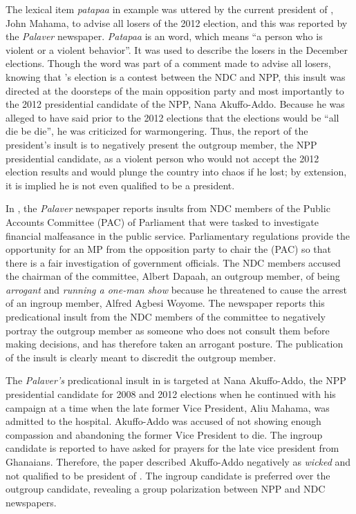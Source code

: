 \documentclass[output=paper,modfonts]{langscibook}
\begin{document}
The lexical item \textit{patapaa} in example  was uttered by the current president of , John Mahama, to advise all losers of the 2012 election, and this was reported by the \textit{ Palaver} newspaper. \textit{Patapaa} is an  word, which means “a person who is violent or a violent behavior”. It was used to describe the losers in the December elections. Though the word was part of a comment made to advise all losers, knowing that ’s election is a contest between the NDC and NPP, this insult was directed at the doorsteps of the main opposition party and most importantly to the 2012 presidential candidate of the NPP, Nana Akuffo-Addo. Because he was alleged to have said prior to the 2012 elections that the elections would be “all die be die”, he was criticized for warmongering. Thus, the report of the president’s insult is to negatively present the outgroup member, the NPP presidential candidate, as a violent person who would not accept the 2012 election results and would plunge the country into chaos if he lost; by extension, it is implied he is not even qualified to be a president.

In , the \textit{ Palaver} newspaper reports insults from NDC members of the Public Accounts Committee (PAC) of Parliament that were tasked to investigate financial malfeasance in the public service. Parliamentary regulations provide the opportunity for an MP from the opposition party to chair the (PAC) so that there is a fair investigation of government officials. The NDC members accused the chairman of the committee, Albert  Dapaah, an outgroup member, of being \textit{arrogant} and \textit{running a one-man show} because he threatened to cause the arrest of an ingroup member, Alfred Agbesi Woyome. The newspaper reports this predicational insult from the NDC members of the committee to negatively portray the outgroup member as someone who does not consult them before making decisions, and has therefore taken an arrogant posture. The publication of the insult is clearly meant to discredit the outgroup member.

The \textit{ Palaver’s} predicational insult in  is targeted at Nana Akuffo-Addo, the NPP presidential candidate for 2008 and 2012 elections when he continued with his campaign at a time when the late former Vice President, Aliu Mahama, was admitted to the hospital. Akuffo-Addo was accused of not showing enough compassion and abandoning the former Vice President to die. The ingroup candidate is reported to have asked for prayers for the late vice president from Ghanaians. Therefore, the paper described Akuffo-Addo negatively as \textit{wicked} and not qualified to be president of . The ingroup candidate is preferred over the outgroup candidate, revealing a group polarization between NPP and NDC newspapers.
\end{document}
